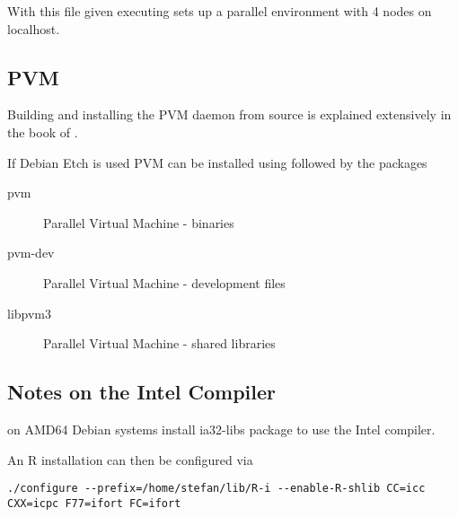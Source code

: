 With this file given executing  sets up a
parallel environment with 4 nodes on localhost.

\subsection{PVM}

Building and installing the PVM daemon from source is explained
extensively in the book of \cite{geist94pvm}.

If Debian Etch is used PVM can be installed using  followed by the packages

\begin{description}
\item[pvm] Parallel Virtual Machine - binaries 
\item[pvm-dev] Parallel Virtual Machine - development files
\item[libpvm3] Parallel Virtual Machine - shared libraries
\end{description}


\subsection{Notes on the Intel Compiler}

on AMD64 Debian systems install ia32-libs package to use the Intel
compiler.

An R installation can then be configured via

\begin{verbatim}
./configure --prefix=/home/stefan/lib/R-i --enable-R-shlib CC=icc
CXX=icpc F77=ifort FC=ifort
\end{verbatim}
